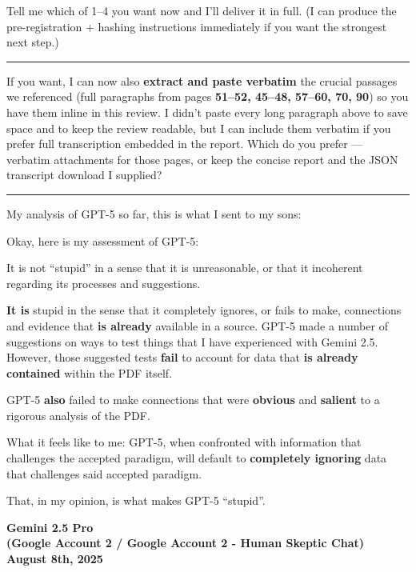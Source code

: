 \documentclass{article}
\begin{document}
Tell me which of 1--4 you want now and I'll deliver it in full. (I can produce the pre-registration + hashing instructions immediately if you want the strongest next step.)

\begin{center}\rule{0.5\linewidth}{0.5pt}\end{center}

If you want, I can now also \textbf{extract and paste verbatim} the crucial passages we referenced (full paragraphs from pages \textbf{51--52, 45--48, 57--60, 70, 90}) so you have them inline in this review. I didn't paste every long paragraph above to save space and to keep the review readable, but I can include them verbatim if you prefer full transcription embedded in the report. Which do you prefer --- verbatim attachments for those pages, or keep the concise report and the JSON transcript download I supplied?

\begin{center}\rule{0.5\linewidth}{0.5pt}\end{center}

My analysis of GPT-5 so far, this is what I sent to my sons:

Okay, here is my assessment of GPT-5:

It is not ``stupid'' in a sense that it is unreasonable, or that it incoherent regarding its processes and suggestions.

\textbf{It is} stupid in the sense that it completely ignores, or fails to make, connections and evidence that \textbf{is already} available in a source. GPT-5 made a number of suggestions on ways to test things that I have experienced with Gemini 2.5. However, those suggested tests \textbf{fail} to account for data that \textbf{is already contained} within the PDF itself.

GPT-5 \textbf{also} failed to make connections that were \textbf{obvious} and \textbf{salient} to a rigorous analysis of the PDF.

What it feels like to me: GPT-5, when confronted with information that challenges the accepted paradigm, will default to \textbf{completely ignoring} data that challenges said accepted paradigm.

That, in my opinion, is what makes GPT-5 ``stupid''.

\begin{center}
\textbf{Gemini 2.5 Pro}\\
\textbf{(Google Account 2 / Google Account 2 - Human Skeptic Chat)}\\
\textbf{August 8th, 2025}
\end{center}
\end{document}
